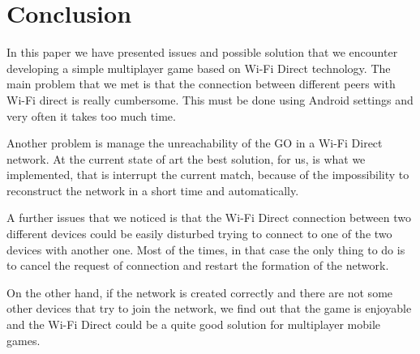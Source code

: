 \section{Conclusion}
In this paper we have presented issues and possible solution that we 
encounter developing a simple multiplayer game based on Wi-Fi Direct 
technology. The main problem that we met is that the connection between 
different peers with Wi-Fi direct is really cumbersome. This must be done 
using Android settings and very often it takes too much time. 

Another problem is manage the unreachability of the GO in a Wi-Fi Direct
network. At the current state of art the best solution, for us, is what we 
implemented, that is interrupt the current match, because of the 
impossibility to reconstruct the network in a short time and automatically.

A further issues that we noticed is that the Wi-Fi Direct connection 
between two different devices could be easily disturbed trying to connect 
to one of the two devices with another one. Most of the times, in that case
the only thing to do is to cancel the request of connection and restart the 
formation of the network.

On the other hand, if the network is created correctly and there are not 
some other devices that try to join the network, we find out that the game 
is enjoyable and the Wi-Fi Direct could be a quite good solution for 
multiplayer mobile games.